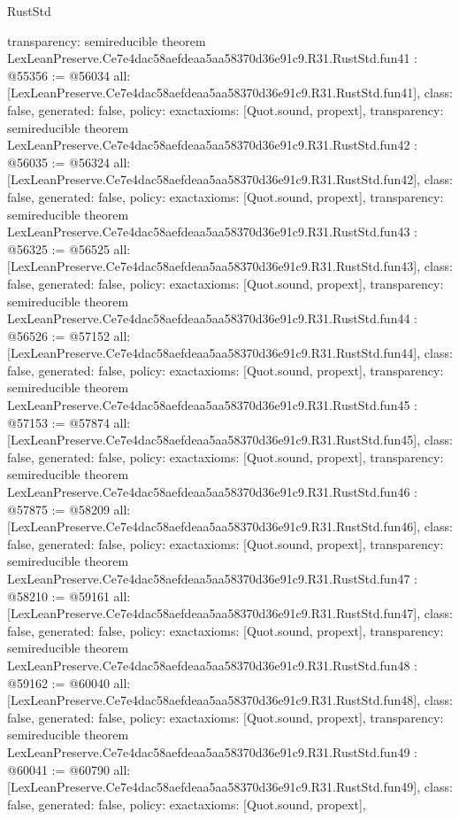 \begin{lexlean}{RustStd}
\begin{coremodule}
{  transparency: semireducible
}
theorem LexLeanPreserve.Ce7e4dac58aefdeaa5aa58370d36e91c9.R31.RustStd.fun41 : @55356 := @56034 {
  all: [LexLeanPreserve.Ce7e4dac58aefdeaa5aa58370d36e91c9.R31.RustStd.fun41],
  class: false,
  generated: false,
  policy: exact{axioms: [Quot.sound, propext]},
  transparency: semireducible
}
theorem LexLeanPreserve.Ce7e4dac58aefdeaa5aa58370d36e91c9.R31.RustStd.fun42 : @56035 := @56324 {
  all: [LexLeanPreserve.Ce7e4dac58aefdeaa5aa58370d36e91c9.R31.RustStd.fun42],
  class: false,
  generated: false,
  policy: exact{axioms: [Quot.sound, propext]},
  transparency: semireducible
}
theorem LexLeanPreserve.Ce7e4dac58aefdeaa5aa58370d36e91c9.R31.RustStd.fun43 : @56325 := @56525 {
  all: [LexLeanPreserve.Ce7e4dac58aefdeaa5aa58370d36e91c9.R31.RustStd.fun43],
  class: false,
  generated: false,
  policy: exact{axioms: [Quot.sound, propext]},
  transparency: semireducible
}
theorem LexLeanPreserve.Ce7e4dac58aefdeaa5aa58370d36e91c9.R31.RustStd.fun44 : @56526 := @57152 {
  all: [LexLeanPreserve.Ce7e4dac58aefdeaa5aa58370d36e91c9.R31.RustStd.fun44],
  class: false,
  generated: false,
  policy: exact{axioms: [Quot.sound, propext]},
  transparency: semireducible
}
theorem LexLeanPreserve.Ce7e4dac58aefdeaa5aa58370d36e91c9.R31.RustStd.fun45 : @57153 := @57874 {
  all: [LexLeanPreserve.Ce7e4dac58aefdeaa5aa58370d36e91c9.R31.RustStd.fun45],
  class: false,
  generated: false,
  policy: exact{axioms: [Quot.sound, propext]},
  transparency: semireducible
}
theorem LexLeanPreserve.Ce7e4dac58aefdeaa5aa58370d36e91c9.R31.RustStd.fun46 : @57875 := @58209 {
  all: [LexLeanPreserve.Ce7e4dac58aefdeaa5aa58370d36e91c9.R31.RustStd.fun46],
  class: false,
  generated: false,
  policy: exact{axioms: [Quot.sound, propext]},
  transparency: semireducible
}
theorem LexLeanPreserve.Ce7e4dac58aefdeaa5aa58370d36e91c9.R31.RustStd.fun47 : @58210 := @59161 {
  all: [LexLeanPreserve.Ce7e4dac58aefdeaa5aa58370d36e91c9.R31.RustStd.fun47],
  class: false,
  generated: false,
  policy: exact{axioms: [Quot.sound, propext]},
  transparency: semireducible
}
theorem LexLeanPreserve.Ce7e4dac58aefdeaa5aa58370d36e91c9.R31.RustStd.fun48 : @59162 := @60040 {
  all: [LexLeanPreserve.Ce7e4dac58aefdeaa5aa58370d36e91c9.R31.RustStd.fun48],
  class: false,
  generated: false,
  policy: exact{axioms: [Quot.sound, propext]},
  transparency: semireducible
}
theorem LexLeanPreserve.Ce7e4dac58aefdeaa5aa58370d36e91c9.R31.RustStd.fun49 : @60041 := @60790 {
  all: [LexLeanPreserve.Ce7e4dac58aefdeaa5aa58370d36e91c9.R31.RustStd.fun49],
  class: false,
  generated: false,
  policy: exact{axioms: [Quot.sound, propext]},
}
\end{coremodule}
\end{lexlean}
